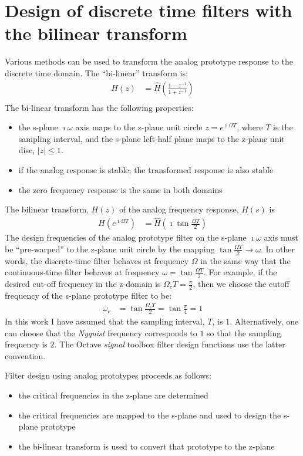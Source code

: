\documentclass[a4paper,twoside,10pt,english]{report}
\begin{document}
\section{Design of discrete time filters with the bilinear transform}
Various methods can be used to transform the analog prototype
response to the discrete time domain. The ``bi-linear'' transform is:
\begin{align*}
H\left(z\right)&=\hat{H}\left(\frac{1-z^{-1}}{1+z^{-1}}\right)\\
\end{align*}
The bi-linear transform has the following 
properties:
\begin{itemize}
\item the s-plane $\imath\omega$ axis maps to the z-plane unit circle
  $z=e^{\imath\Omega T}$, where $T$ is the sampling interval, and the s-plane
  left-half plane maps to the z-plane unit disc, $\left|z\right|\le 1$.
\item if the analog response is stable, the transformed response
is also stable
\item the zero frequency response is the same in both domains
\end{itemize}
The bilinear transform, $H\left(z\right)$ of the analog frequency response, 
$\hat{H}\left(s\right)$ is
\begin{align*}
H\left(e^{\imath\Omega T}\right)&=
\hat{H}\left(\imath\tan\frac{\Omega T}{2}\right)
\end{align*}
The design frequencies of the analog prototype filter on the s-plane
$\imath\omega$ axis must be ``pre-warped'' to the z-plane unit circle by the
mapping $\tan\frac{\Omega T}{2}\rightarrow\omega$. In other words, the
discrete-time filter behaves at frequency $\Omega$ in the same way that the
continuous-time filter behaves at frequency $\omega=\tan\frac{\Omega T}{2}$.
For example, if the desired cut-off frequency in the z-domain is
$\Omega_{c} T=\frac{\pi}{2}$, then we choose the cutoff frequency of the s-plane
prototype filter to be:
\begin{align*}
  \omega_{c}&=\tan\frac{\Omega_{c} T}{2} = \tan\frac{\pi}{4} = 1
\end{align*}
In this work I have assumed that the sampling interval, $T$, is $1$.
Alternatively, one can choose that the \emph{Nyquist} frequency
corresponds to $1$ so that the sampling frequency is $2$. The Octave
\emph{signal} toolbox filter design functions use the latter convention.

Filter design using analog prototypes proceeds as follows:
\begin{itemize}
\item the critical frequencies in the z-plane are determined
\item the critical frequencies are mapped to the s-plane and used
to design the s-plane prototype
\item the bi-linear transform is used to convert that prototype to the z-plane
\end{itemize}
\end{document}
